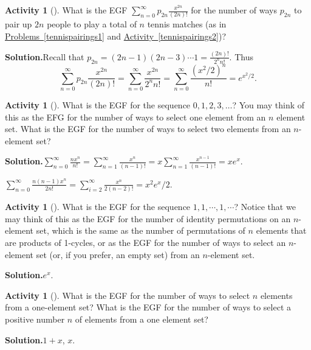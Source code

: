 \documentclass[10pt,]{book}
\theoremstyle{plain}
\theoremstyle{definition}
\newtheorem{activity}[project]{Activity}
\numberwithin{equation}{chapter}
\begin{document}
\begin{activity}[]\label{exponentialtennisparings}
What is the EGF \(\sum_{n=0}^\infty
p_{2n}\frac{x^{2n}}{(2n)!}\) for the number of ways \(p_{2n}\) to pair up \(2n\) people to play a total of \(n\) tennis matches (as in \hyperref[tennispairings1]{Problems~\ref{tennispairings1}} and \hyperref[tennispairings2]{Activity~\ref{tennispairings2}})?%
\par\medskip\noindent%
\textbf{Solution.}\quad Recall that \(p_{2n} = (2n-1)(2n-3)\cdots 1= \frac{(2n)!}{2^n
n!}\). Thus%
\begin{equation*}
\sum_{n=0}^\infty
p_{2n}\frac{x^{2n}}{(2n)!}= \sum_{n=0}^\infty \frac{x^{2n}}{2^n n!} =
\sum_{n=0}^\infty \frac{({x^2/2})^n}{n!} = e^{x^2/2} .
\end{equation*}
%
\end{activity}
\begin{activity}[]\label{activity-357}
What is the EGF for the sequence \(0,1,2,3,\ldots\)? You may think of this as the EFG for the number of ways to select one element from an \(n\) element set. What is the EGF for the number of ways to select two elements from an \(n\)-element set?%
\par\medskip\noindent%
\textbf{Solution.}\quad \(\sum_{n=0}^\infty\frac{nx^n}{n!}=\sum_{n=1}^\infty\frac{x^n}{(n-1)!}=x\sum_{n=1}^\infty\frac{x^{n-1}}{(n-1)!}=xe^x\).%
\par
\(\sum_{n=0}^\infty\frac{n(n-1)x^n}{2 n!}=\sum_{i=2}^\infty \frac{x^n}{2(n-2)!}=x^2e^x/2\).%
\end{activity}
\begin{activity}[]\label{allonessequence}
What is the EGF for the sequence \(1,1,\cdots,1,\cdots\)? Notice that we may think of this as the EGF for the number of identity permutations on an \(n\)-element set, which is the same as the number of permutations of \(n\) elements that are products of 1-cycles, or as the EGF for the number of ways to select an \(n\)-element set (or, if you prefer, an empty set) from an \(n\)-element set.%
\par\medskip\noindent%
\textbf{Solution.}\quad \(e^x\).%
\end{activity}
\begin{activity}[]\label{activity-359}
What is the EGF for the number of ways to select \(n\) elements from a one-element set? What is the EGF for the number of ways to select a positive number \(n\) of elements from a one element set?%
\par\medskip\noindent%
\textbf{Solution.}\quad \(1+x\), \(x\).%
\end{activity}
\end{document}
